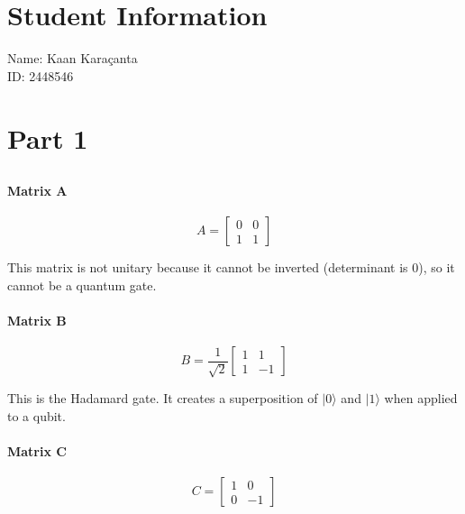 \documentclass[12pt]{article}
\begin{document}
\section*{Student Information}

Name: Kaan Karaçanta \\

ID: 2448546 \\


\section*{Part 1}

\subsection*{}

\paragraph*{Matrix A}

$$ A = 
\begin{bmatrix} 
        0 & 0 \\ 
        1 & 1 
    \end{bmatrix} $$

This matrix is not unitary because it cannot be inverted (determinant is 0), so it cannot be a quantum gate.

\paragraph*{Matrix B}

$$ B = 
\frac{1}{\sqrt{2}} \begin{bmatrix}
                        1 & 1 \\ 
                        1 & -1 
                    \end{bmatrix}
$$

This is the Hadamard gate. It creates a superposition of $|0⟩$ and $|1⟩$ when applied to a qubit. 

\paragraph*{Matrix C}

$$ C =
\begin{bmatrix}
    1 & 0 \\
    0 & -1
\end{bmatrix}
$$
\end{document}
